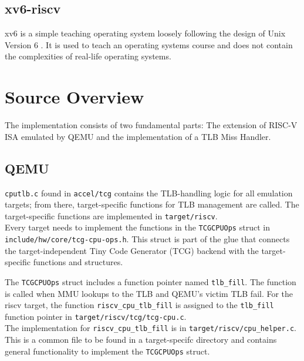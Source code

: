 

\subsection{xv6-riscv}
xv6 is a simple teaching operating system loosely following the design of Unix Version 6 \cite{cox2011xv6}.
It is used to teach an operating systems course and does not contain the complexities of real-life
operating systems.

\section{Source Overview}
The implementation consists of two fundamental parts:
The extension of RISC-V ISA emulated by QEMU and the implementation of a
TLB Miss Handler.


\subsection{QEMU}
\texttt{cputlb.c} found in \texttt{accel/tcg} contains the TLB-handling logic for all
emulation targets; from there, target-specific functions for TLB management are called.
The target-specific functions are implemented in \texttt{target/riscv}.\\
Every target needs to implement the functions in the \texttt{TCGCPUOps} struct in
\texttt{include/hw/core/tcg-cpu-ops.h}. This struct is part of the glue that connects the target-independent
Tiny Code Generator (TCG) backend with the target-specific functions and structures.




The \texttt{TCGCPUOps} struct includes a function pointer named \texttt{tlb\_fill}. The function is called
when MMU lookups to the TLB and QEMU's victim TLB fail.
For the riscv target, the function \texttt{riscv\_cpu\_tlb\_fill} is assigned to the \texttt{tlb\_fill}
function pointer in \texttt{target/riscv/tcg/tcg-cpu.c}.\\
The implementation for \texttt{riscv\_cpu\_tlb\_fill} is in \texttt{target/riscv/cpu\_helper.c}. This is a common
file to be found in a target-specifc directory and contains general functionality to implement the \texttt{TCGCPUOps} struct.\\


